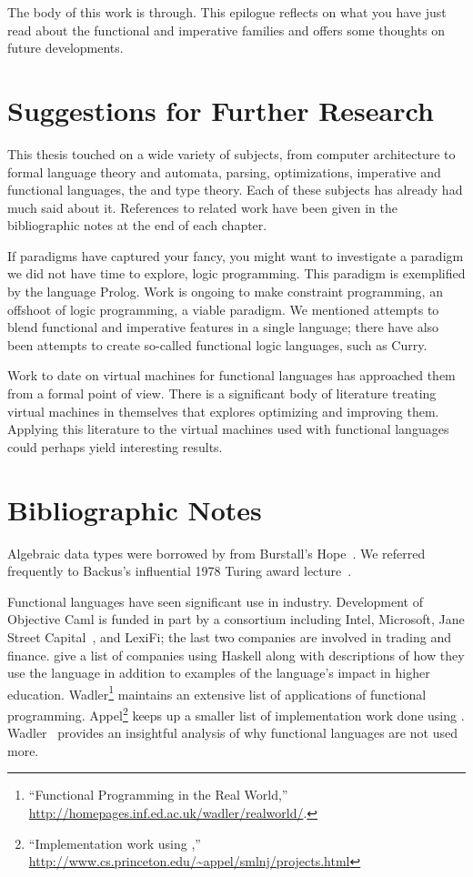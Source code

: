 \label{epilogue:epilogue}
The body of this work is through. This epilogue reflects on what you have just read about the functional and imperative families and offers some thoughts on future developments.





\section*{Suggestions for Further Research}
This thesis touched on a wide variety of subjects, from computer architecture to formal language theory and automata, parsing, optimizations, imperative and functional languages, the \lambdacalc and type theory. Each of these subjects has already had much said about it. References to related work have been given in the bibliographic notes at the end of each chapter.

If paradigms have captured your fancy, you might want to investigate a paradigm we did not have time to explore, logic programming. This paradigm is exemplified by the language Prolog. Work is ongoing to make constraint programming, an offshoot of logic programming, a viable paradigm. We mentioned attempts to blend functional and imperative features in a single language; there have also been attempts to create so-called functional logic languages, such as Curry.

Work to date on virtual machines for functional languages has approached them from a formal point of view. There is a significant body of literature treating virtual machines in themselves that explores optimizing and improving them. Applying this literature to the virtual machines used with functional languages could perhaps yield interesting results.

\section*{Bibliographic Notes}
Algebraic data types were borrowed by \ML from Burstall's Hope~\citep{Burstall:HOPE:1980}. We referred frequently to Backus's influential 1978 Turing award lecture~\citep{Backus:Can-programming:1978}.

Functional languages have seen significant use in industry. Development of Objective Caml is funded in part by a consortium including Intel, Microsoft, Jane Street Capital~\citep{Minsky:Caml:2008}, and LexiFi; the last two companies are involved in trading and finance.  give a list of companies using Haskell along with descriptions of how they use the language in addition to examples of the language's impact in higher education. Wadler\footnote{``Functional Programming in the Real World,'' \url{http://homepages.inf.ed.ac.uk/wadler/realworld/}.} maintains an extensive list of applications of functional programming. Appel\footnote{``Implementation work using \ML{},'' \url{http://www.cs.princeton.edu/~appel/smlnj/projects.html}} keeps up a smaller list of implementation work done using \ML{}. Wadler~\citep{Wadler:Why-no-one-uses:1998} provides an insightful analysis of why functional languages are not used more.

